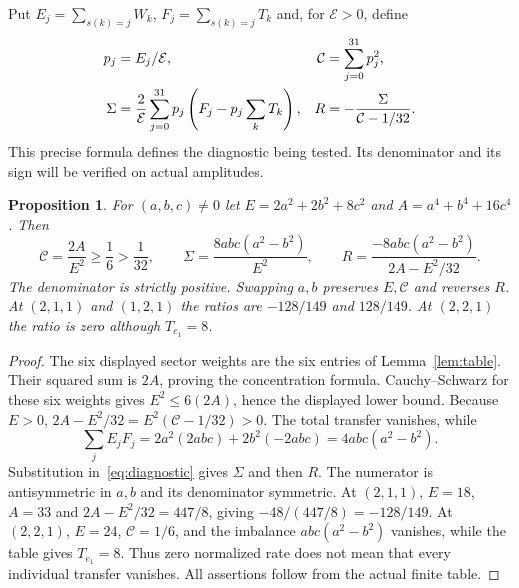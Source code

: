 \documentclass[11pt]{article}
\newtheorem{proposition}[theorem]{Proposition}
\begin{document}
Put $E_j=\sum_{s(k)=j}W_k$, $F_j=\sum_{s(k)=j}T_k$ and, for
$\mathcal E>0$, define
\begin{align}\label{eq:diagnostic}
 p_j&=E_j/\mathcal E, &\mathcal C&=\sum_{j=0}^{31}p_j^2,\notag\\
 \Sigma&=\frac2{\mathcal E}\sum_{j=0}^{31}
             p_j\left(F_j-p_j\sum_kT_k\right),
 &R&=-\frac{\Sigma}{\mathcal C-1/32}.
\end{align}
This precise formula defines the diagnostic being tested. Its
denominator and its sign will be verified on actual amplitudes.

\begin{proposition}\label{prop:ratio}
For $(a,b,c)\ne0$ let $E=2a^2+2b^2+8c^2$ and
$A=a^4+b^4+16c^4$. Then
\begin{equation}\label{eq:ratio}
 \mathcal C=\frac{2A}{E^2}\geq\frac16>\frac1{32},\qquad
 \Sigma=\frac{8abc(a^2-b^2)}{E^2},\qquad
 R=\frac{-8abc(a^2-b^2)}{2A-E^2/32}.
\end{equation}
The denominator is strictly positive. Swapping $a,b$ preserves
$E,\mathcal C$ and reverses $R$. At $(2,1,1)$ and $(1,2,1)$ the
ratios are $-128/149$ and $128/149$. At $(2,2,1)$ the ratio is
zero although $T_{e_1}=8$.
\end{proposition}
\begin{proof}
The six displayed sector weights are the six entries of Lemma~\ref{lem:table}.
Their squared sum is $2A$, proving the concentration formula.
Cauchy--Schwarz for these six weights gives
$E^2\leq6(2A)$, hence the displayed lower bound. Because $E>0$,
$2A-E^2/32=E^2(\mathcal C-1/32)>0$.
The total transfer vanishes, while
\[
 \sum_jE_jF_j=2a^2(2abc)+2b^2(-2abc)=4abc(a^2-b^2).
\]
Substitution in~\eqref{eq:diagnostic} gives $\Sigma$ and then $R$.
The numerator is antisymmetric in $a,b$ and its denominator symmetric.
At $(2,1,1)$, $E=18$, $A=33$ and
$2A-E^2/32=447/8$, giving $-48/(447/8)=-128/149$.
At $(2,2,1)$, $E=24$, $\mathcal C=1/6$, and the imbalance
$abc(a^2-b^2)$ vanishes, while the table gives $T_{e_1}=8$.
Thus zero normalized rate does not mean that every individual transfer
vanishes. All assertions follow from the actual finite table.
\end{proof}
\end{document}
